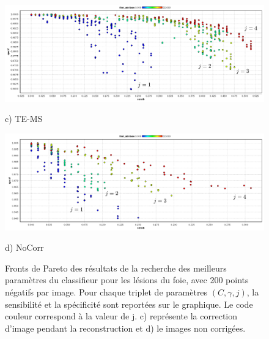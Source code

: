 \begin{figure}[h!]

\begin{center}
\includegraphics[width=14cm]{images/pareto_mod_LOR19}
 
{\small c) TE-MS}
\vspace{0.5cm}

\includegraphics[width=14cm]{images/pareto_mod_NoCorr19}

{\small d) NoCorr}

\end{center}
 \caption[(2/2) Fronts de Pareto des résultats de la recherche des meilleurs paramètres du classifieur pour les lésions du foie]{Fronts de Pareto des résultats de la recherche des meilleurs paramètres du classifieur pour les lésions du foie, avec 200 points négatifs par image. Pour chaque triplet de paramètres $(C, \gamma, j)$, la sensibilité et la spécificité sont reportées sur le graphique. Le code couleur correspond à la valeur de j. c) représente la correction d'image pendant la reconstruction et d) le images non corrigées.}
\label{fig:paretoModalite19_2} 
\end{figure}

